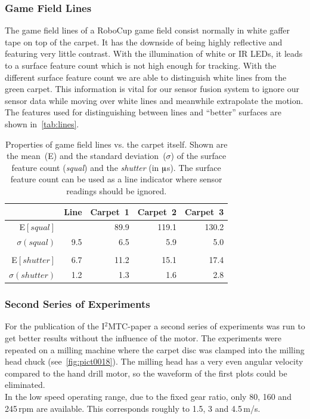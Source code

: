\documentclass[12pt,a4paper]{article}
\begin{document}
\subsubsection{Game Field Lines}

The game field lines of a RoboCup game field consist normally in white gaffer tape on top of the carpet.
It has the downside of being highly reflective and featuring very little contrast.
With the illumination of white or IR LEDs, it leads to a surface feature count which is not high enough for tracking.
With the different surface feature count we are able to distinguish white lines from the green carpet.
This information is vital for our sensor fusion system to ignore our sensor data while moving over white lines and meanwhile extrapolate the motion.
The features used for distinguishing between lines and ``better'' surfaces are shown in~\autoref{tab:lines}.

\begin{table}[htbp]
    \centering
    \begin{tabular}{r|r|r|r|r}
       & Line & Carpet~1 & Carpet~2 & Carpet~3 \\
       \hline
       E$[ squal ] $     & \color{red}{13.5}  &  89.9  & 119.1 & 130.2    \\
       $\sigma ( squal ) $ & 9.5   &  6.5   & 5.9   & 5.0     \\
       & & & & \\
       E$[ shutter  ]  $ & 6.7  &  11.2  & 15.1  & 17.4     \\
       $\sigma ( shutter)$ & 1.2  &  1.3   & 1.6   & 2.8     \\

    \end{tabular}
  \caption{\label{tab:lines}Properties of game field lines vs. the carpet itself.
  Shown are the mean~(E) and the standard deviation~($\sigma$) of the surface feature count (\emph{squal}) and the \emph{shutter} (in $\muup$s).
  The surface feature count can be used as a line indicator where sensor readings should be ignored.}
\end{table}

\newpage

\subsubsection{Second Series of Experiments}

For the publication of the I$^2$MTC-paper a second series of experiments was run to get better results without the influence of the motor.
The experiments were repeated on a milling machine where the carpet disc was clamped into the milling head chuck (see~\autoref{fig:pict0018}).
The milling head has a very even angular velocity compared to the hand drill motor, so the waveform of the first plots could be eliminated.\\
In the low speed operating range, due to the fixed gear ratio, only 80, 160 and 245\,rpm are available. 
This corresponds roughly to 1.5, 3 and 4.5\,m/s.
\end{document}
